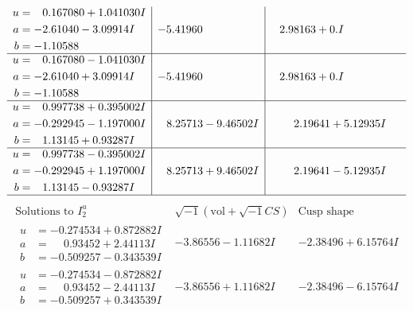 \documentclass[1p]{elsarticle_modified}
\theoremstyle{definition}
\newcommand{\I}{\sqrt{-1}}
\begin{document}
$$\begin{array}{c|c|c}
\begin{aligned}
u &= \phantom{-}0.167080 + 1.041030 I \\
a &= -2.61040 - 3.09914 I \\
b &= -1.10588\phantom{ +0.000000I}\end{aligned}
 & -5.41960\phantom{ +0.000000I} & \phantom{-}2.98163 + 0. I\phantom{ +0.000000I} \\ \hline\begin{aligned}
u &= \phantom{-}0.167080 - 1.041030 I \\
a &= -2.61040 + 3.09914 I \\
b &= -1.10588\phantom{ +0.000000I}\end{aligned}
 & -5.41960\phantom{ +0.000000I} & \phantom{-}2.98163 + 0. I\phantom{ +0.000000I} \\ \hline\begin{aligned}
u &= \phantom{-}0.997738 + 0.395002 I \\
a &= -0.292945 - 1.197000 I \\
b &= \phantom{-}1.13145 + 0.93287 I\end{aligned}
 & \phantom{-}8.25713 - 9.46502 I & \phantom{-}2.19641 + 5.12935 I \\ \hline\begin{aligned}
u &= \phantom{-}0.997738 - 0.395002 I \\
a &= -0.292945 + 1.197000 I \\
b &= \phantom{-}1.13145 - 0.93287 I\end{aligned}
 & \phantom{-}8.25713 + 9.46502 I & \phantom{-}2.19641 - 5.12935 I\\
 \hline 
 \end{array}$$\newpage$$\begin{array}{c|c|c}  
\text{Solutions to }I^u_{2}& \I (\text{vol} + \sqrt{-1}CS) & \text{Cusp shape}\\
 \hline 
\begin{aligned}
u &= -0.274534 + 0.872882 I \\
a &= \phantom{-}0.93452 + 2.44113 I \\
b &= -0.509257 - 0.343539 I\end{aligned}
 & -3.86556 - 1.11682 I & -2.38496 + 6.15764 I \\ \hline\begin{aligned}
u &= -0.274534 - 0.872882 I \\
a &= \phantom{-}0.93452 - 2.44113 I \\
b &= -0.509257 + 0.343539 I\end{aligned}
 & -3.86556 + 1.11682 I & -2.38496 - 6.15764 I \\ \hline\begin{aligned}

\end{aligned}
\end{array}$$
\end{document}
